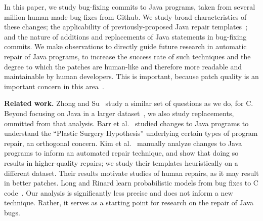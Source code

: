 \documentclass{sig-alternate-05-2015}
\begin{document}
In this paper, we study bug-fixing commits to Java programs, 
taken from several million human-made bug fixes from Github. We study broad
characteristics of these changes; the applicability of previously-proposed
Java repair templates~\cite{kim2013}; and the nature
of additions and replacements of Java statements in bug-fixing commits. We make
observations to directly guide future research in automatic repair of Java
programs, to increase the success rate of such techniques and the degree to
which the patches are human-like and therefore more readable and maintainable by
human developers. This is important, because patch quality is an important
concern in this area~\cite{Qi15}.


\vspace{1ex}
\noindent\textbf{Related work.} Zhong and Su~\cite{zhong2015} study
a similar set of questions as we do, for C.  Beyond focusing on Java in a larger dataset~\cite{dyer2013}, we also study
replacements, ommitted from that analysis.  Barr et al.~\cite{Barr14fse} studied changes to
Java programs to understand the ``Plastic Surgery Hypothesis'' underlying
certain types of program repair, an orthogonal
concern. Kim et al.~\cite{kim2013} manually analyze 
changes to Java programs to inform an automated repair
technique, and show that doing so results in higher-quality repairs; 
we study their templates heuristically on
a different dataset. Their results motivate
studies of human repairs, as it may result in better patches.
Long and Rinard learn probabilistic models from bug fixes to C
code~\cite{Long2016}. Our analysis is significantly less precise and does not
inform a new technique.  Rather, it serves as a starting
point for research on the repair of Java bugs.
\end{document}
